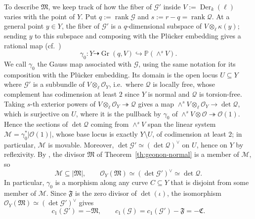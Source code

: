 \documentclass[10pt,abstract=true]{scrartcl}
\numberwithin{equation}{section}
\theoremstyle{definition}
\theoremstyle{remark}
\begin{document}
To describe $\mathfrak M$, we keep track of how the fiber of $\mathscr G'$ inside $V:=\operatorname{Der}_k(\ell)$ varies with the point of $Y$.
Put $q:=\operatorname{rank}\mathscr G$ and $s:=r-q=\operatorname{rank}\mathscr Q$.
At a general point $y\in Y$, the fiber of $\mathscr G'$ is a $q$-dimensional subspace of $V\otimes_\ell\kappa(y)$; sending $y$ to this subspace and composing with the Pl\"ucker embedding gives a rational map (cf.\ \cite[\S2.3]{ji_structure_2021})
\begin{equation}\label{eq:foliation-grassmannian-map}
  \gamma_0\colon Y\dashrightarrow\operatorname{Gr}(q,V)\hookrightarrow\mathbb P(\wedge^s V).
\end{equation}
We call $\gamma_0$ the Gauss map associated with $\mathscr G$, using the same notation for its composition with the Pl\"ucker embedding.
Its domain is the open locus $U\subseteq Y$ where $\mathscr G'$ is a subbundle of $V\otimes_\ell\mathcal O_Y$, i.e.\ where $\mathscr Q$ is locally free, whose complement has codimension at least $2$ since $Y$ is normal and $\mathscr Q$ is torsion-free.
Taking $s$-th exterior powers of $V\otimes_\ell\mathcal O_Y\twoheadrightarrow\mathscr Q$ gives a map $\wedge^s V\otimes_\ell\mathcal O_Y\to\det\mathscr Q$, which is surjective on $U$, where it is the pullback by $\gamma_0$ of $\wedge^s V\otimes\mathcal O\twoheadrightarrow\mathcal O(1)$.
Hence the sections of $\det\mathscr Q$ coming from $\wedge^s V$ span the linear system $\mathcal M = \gamma_0^*|\mathcal O(1)|$, whose base locus is exactly $Y\setminus U$, of codimension at least $2$; in particular, $\mathcal M$ is movable.
Moreover, $\det\mathscr G'\simeq(\det\mathscr Q)^\vee$ on $U$, hence on $Y$ by reflexivity.
By \cite[Definition~5.1 and Lemma~5.2]{ji_structure_2021}, the divisor $\mathfrak M$ of Theorem~\ref{th:geonon-normal} is a member of $\mathcal M$, so
\[
  \mathcal M\subseteq|\mathfrak M|,\qquad
  \mathcal O_Y(\mathfrak M)\simeq(\det\mathscr G')^\vee\simeq\det\mathscr Q.
\]
In particular, $\gamma_0$ is a morphism along any curve $C\subseteq Y$ that is disjoint from some member of $\mathcal M$.
Since $\mathfrak F$ is the zero divisor of $\det(\iota)$, the isomorphism $\mathcal O_Y(\mathfrak M)\simeq(\det\mathscr G')^\vee$ gives
\begin{equation}\label{eq:foliation-chern-class}
  c_1(\mathscr G')=-\mathfrak M,\qquad
  c_1(\mathscr G)=c_1(\mathscr G')-\mathfrak F=-\mathfrak C.
\end{equation}
\end{document}

